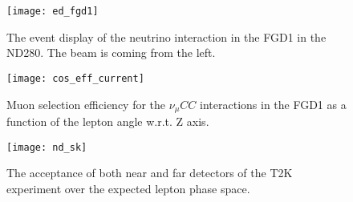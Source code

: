 \documentclass[main.tex]{subfiles}
\begin{document}
\begin{figure}[!ht]
  \centering
  \begin{minipage}{0.49\linewidth}
      \begin{flushleft}
      \begin{minipage}{0.9\linewidth}
      \texttt{[image: ed\_fgd1]}
      \caption{The event display of the neutrino interaction in the FGD1 in the ND280. The beam is coming from the left.}
      \label{fig:up:ed_fgd1}
      \end{minipage}
      \begin{minipage}{0.1\linewidth}
      \end{minipage}
      \end{flushleft}
  \end{minipage}
  \begin{minipage}{0.49\linewidth}
      \begin{flushright}
      \begin{minipage}{0.1\linewidth}
      \end{minipage}
      \begin{minipage}{0.9\linewidth}
      \texttt{[image: cos\_eff\_current]}
      \caption{Muon selection efficiency for the $\nu_\mu CC$ interactions in the FGD1 as a function of the lepton angle w.r.t. Z axis.}
      \label{fig:up:cos_eff_current}
      \end{minipage}
      \end{flushright}
  \end{minipage}
\end{figure}

\begin{figure}[!ht]
  \centering
  \texttt{[image: nd\_sk]}
  \caption{The acceptance of both near and far detectors of the T2K experiment over the expected lepton phase space.}
  \label{fig:up:ps}
\end{figure}
\end{document}
